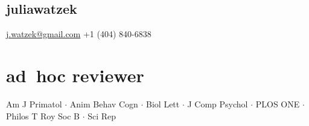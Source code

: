 \documentclass[]{friggeri-cv}
\begin{document}


\begin{aside}
  \section{{\normalfont julia}watzek}
    \href{mailto:j.watzek@gmail.com}{j.watzek@gmail.com}
    +1 (404) 840-6838
\end{aside}

%



\section{ad~hoc reviewer}
    Am J Primatol $\cdot$ Anim Behav Cogn $\cdot$ Biol Lett $\cdot$ J Comp Psychol $\cdot$ PLOS ONE $\cdot$ Philos T Roy Soc B $\cdot$ Sci Rep \\[.5cm]


\end{document}
